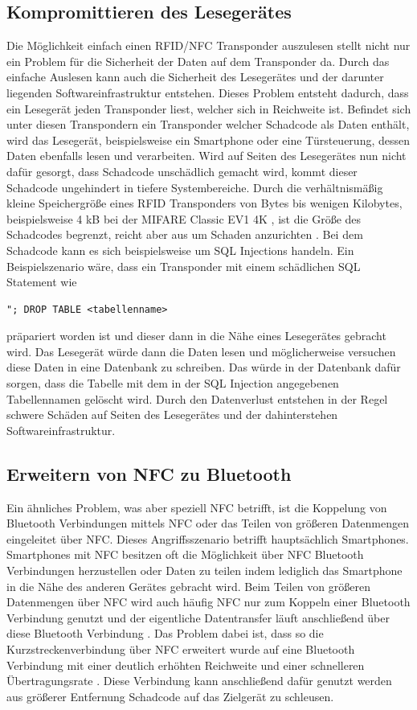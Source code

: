 \documentclass[conference]{IEEEtran}
\begin{document}
\subsection{Kom­pro­mit­tie­ren des Lesegerätes}
Die Möglichkeit einfach einen RFID/NFC Transponder auszulesen stellt nicht nur ein Problem für die Sicherheit der Daten auf dem Transponder da. Durch das einfache Auslesen kann auch die Sicherheit des Lesegerätes und der darunter liegenden Softwareinfrastruktur entstehen. Dieses Problem entsteht dadurch, dass ein Lesegerät jeden Transponder liest, welcher sich in Reichweite ist. Befindet sich unter diesen Transpondern ein Transponder welcher Schadcode als Daten enthält, wird das Lesegerät, beispielsweise ein Smartphone oder eine Türsteuerung, dessen Daten ebenfalls lesen und verarbeiten. Wird auf Seiten des Lesegerätes nun nicht dafür gesorgt, dass Schadcode unschädlich gemacht wird, kommt dieser Schadcode ungehindert in tiefere Systembereiche.
Durch die verhältnismäßig kleine Speichergröße eines RFID Transponders von Bytes bis wenigen Kilobytes, beispielsweise 4 kB bei der MIFARE Classic EV1 4K \cite{b4}, ist die Größe des Schadcodes begrenzt, reicht aber aus um Schaden anzurichten \cite{b5}. Bei dem Schadcode kann es sich beispielsweise um SQL Injections handeln. Ein Beispielszenario wäre, dass ein Transponder mit einem schädlichen SQL Statement wie
\begin{lstlisting}[xleftmargin=.07\textwidth, xrightmargin=.07\textwidth]
"; DROP TABLE <tabellenname>
\end{lstlisting}
\cite{b5} präpariert worden ist und dieser dann in die Nähe eines Lesegerätes gebracht wird. Das Lesegerät würde dann die Daten lesen und möglicherweise versuchen diese Daten in eine Datenbank zu schreiben. Das würde in der Datenbank dafür sorgen, dass die Tabelle mit dem in der SQL Injection angegebenen Tabellennamen gelöscht wird. Durch den Datenverlust entstehen in der Regel schwere Schäden auf Seiten des Lesegerätes und der dahinterstehen Softwareinfrastruktur.

\subsection{Erweitern von NFC zu Bluetooth}
Ein ähnliches Problem, was aber speziell NFC betrifft, ist die Koppelung von Bluetooth Verbindungen mittels NFC oder das Teilen von größeren Datenmengen eingeleitet über NFC. Dieses Angriffsszenario betrifft hauptsächlich Smartphones. Smartphones mit NFC besitzen oft die Möglichkeit über NFC Bluetooth Verbindungen herzustellen oder Daten zu teilen indem lediglich das Smartphone in die Nähe des anderen Gerätes gebracht wird. Beim Teilen von größeren Datenmengen über NFC wird auch häufig NFC nur zum Koppeln einer Bluetooth Verbindung genutzt und der eigentliche Datentransfer läuft anschließend über diese Bluetooth Verbindung \cite{b6}. Das Problem dabei ist, dass so die Kurzstreckenverbindung über NFC erweitert wurde auf eine Bluetooth Verbindung mit einer deutlich erhöhten Reichweite und einer schnelleren Übertragungsrate \cite{b6}. Diese Verbindung kann anschließend dafür genutzt werden aus größerer Entfernung Schadcode auf das Zielgerät zu schleusen.
\end{document}
